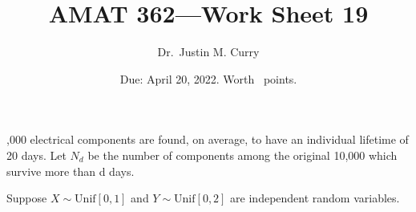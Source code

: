 \documentclass[addpoints,12pt]{exam}
\title{\vspace{-1in} AMAT 362---Work Sheet 19}
\date{Due: April 20, 2022. Worth \numpoints\ points.}
\author{Dr.~Justin M. Curry}
\begin{document}
\maketitle






\begin{questions}


,000 electrical components are found, on average, to have an individual lifetime of 20 days. Let $N_d$ be the number of components among the original 10,000 which survive more than d days.

\noaddpoints
{}
\addpoints

\question[5] Suppose $X\sim \text{Unif}[0,1]$ and $Y\sim \text{Unif}[0,2]$ are independent random variables.

 \noaddpoints
{}
\end{questions}
\end{document}
